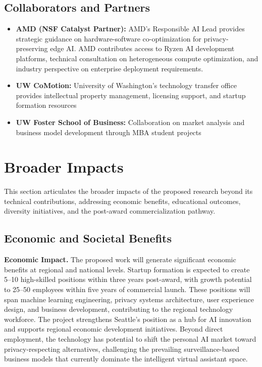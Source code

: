 \documentclass[11pt]{article}
\begin{document}
\subsection{Collaborators and Partners}
\vspace*{-8pt}
\begin{itemize}[noitemsep]
    \item \textbf{AMD (NSF Catalyst Partner):} AMD's Responsible AI Lead 
    provides strategic guidance on hardware-software co-optimization for 
    privacy-preserving edge AI. AMD contributes access to Ryzen AI development 
    platforms, technical consultation on heterogeneous compute optimization, 
    and industry perspective on enterprise deployment requirements.
    \item \textbf{UW CoMotion:} University of Washington's technology transfer 
    office provides intellectual property management, licensing support, and 
    startup formation resources
    \item \textbf{UW Foster School of Business:} Collaboration on market 
    analysis and business model development through MBA student projects
\end{itemize}

\vspace*{-8pt}
\section{Broader Impacts}
\label{sec:impacts}
\vspace*{-8pt}
This section articulates the broader impacts of the proposed research beyond its 
technical contributions, addressing economic benefits, educational outcomes, 
diversity initiatives, and the post-award commercialization pathway.

\vspace*{-8pt}
\subsection{Economic and Societal Benefits}
\vspace*{-8pt}
\textbf{Economic Impact.}
The proposed work will generate significant economic benefits at regional and 
national levels. Startup formation is expected to create 5--10 high-skilled 
positions within three years post-award, with growth potential to 25--50 
employees within five years of commercial launch. These positions will span 
machine learning engineering, privacy systems architecture, user experience 
design, and business development, contributing to the regional technology 
workforce. The project strengthens Seattle's position as a hub for AI innovation 
and supports regional economic development initiatives. Beyond direct employment, 
the technology has potential to shift the personal AI market toward 
privacy-respecting alternatives, challenging the prevailing surveillance-based 
business models that currently dominate the intelligent virtual assistant space.
\end{document}
